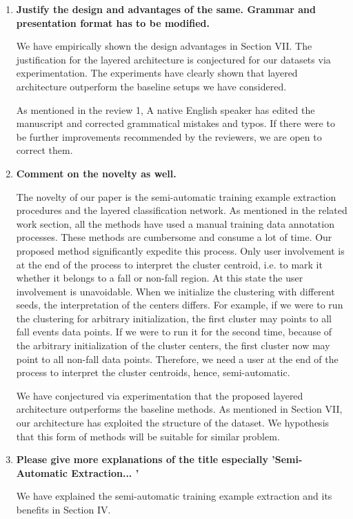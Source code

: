 \documentclass[12pt]{article}
\begin{document}
\begin{enumerate}

\item \textbf{Justify the design and advantages of the same. Grammar and presentation 
format has to be modified.}

We have empirically shown the design advantages in Section VII. The justification for the 
layered architecture is conjectured for our datasets via experimentation. The experiments 
have clearly shown that layered architecture outperform the baseline setups we have 
considered. 

As mentioned in the review 1, A native 
English 
speaker has edited the manuscript and corrected grammatical mistakes and typos.  
If there 
were to be further improvements recommended by the reviewers, we are open to correct 
them.  

\item \textbf{Comment on the novelty as well.}

The novelty of our paper is the semi-automatic training example extraction procedures and 
the layered classification network. As 
mentioned in the related work section, all the methods have used a manual training data 
annotation processes. These methods are cumbersome and consume a lot of time. Our 
proposed 
method significantly expedite this process. Only user involvement is at the end of the 
process to interpret the cluster centroid, i.e. to mark it whether it belongs to a fall 
or 
non-fall region. At this state the user involvement is unavoidable. When we initialize 
the clustering with different seeds, the interpretation of the centers differs. For 
example, if we were to run the clustering for 
arbitrary initialization, the first cluster may points to all fall events data points. If 
we were to run it for the second time, because of the arbitrary initialization of the 
cluster centers, the first cluster now may point to all non-fall data points. Therefore, 
we need a user at the end of the process to interpret the cluster centroids, hence, 
semi-automatic.

We have conjectured via experimentation that the proposed layered architecture 
outperforms the baseline methods. As mentioned in Section VII, our architecture has 
exploited the structure of the dataset. We hypothesis that this form of methods will be 
suitable for similar problem. 

\item \textbf{Please give more explanations of the title especially 'Semi-Automatic 
Extraction... '}

We have explained the semi-automatic training example extraction and its  benefits in 
Section IV. 

\end{enumerate}
\end{document}
